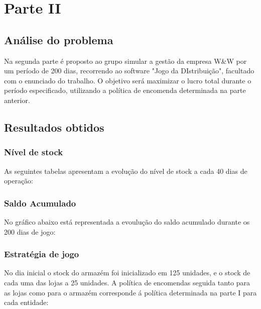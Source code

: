 \chapter{Parte II}

\section{Análise do problema}

Na segunda parte é proposto ao grupo simular a gestão da empresa W\&W por um período de 200 dias, recorrendo ao software "Jogo da DIstribuição", facultado com o enunciado do trabalho. O objetivo será maximizar o lucro total durante o período especificado, utilizando a política de encomenda determinada na parte anterior.

\section{Resultados obtidos}

\subsection{Nível de stock}

As seguintes tabelas apresentam a evolução do nível de stock a cada 40 dias de operação: 










\subsection{Saldo Acumulado}

No gráfico abaixo está representada a evoulução do saldo acumulado durante os 200 dias de jogo:




\subsection{Estratégia de jogo}

No dia inicial o stock do armazém foi inicializado em 125 unidades, e o stock de cada uma das lojas a 25 unidades. A política de encomendas seguida tanto para as lojas como para o armazém corresponde á política determinada na parte I para cada entidade:

